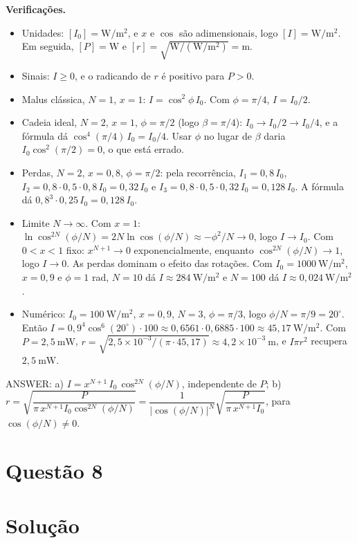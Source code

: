 \documentclass{article}%
\begin{document}
\textbf{Verificações.}
\begin{itemize}
\item Unidades: $[I_0]=\mathrm{W/m^2}$, e $x$ e $\cos$ são adimensionais, logo $[I]=\mathrm{W/m^2}$. Em seguida, $[P]=\mathrm{W}$ e $[r]=\sqrt{\mathrm{W}/(\mathrm{W/m^2})}=\mathrm{m}$.
\item Sinais: $I\ge 0$, e o radicando de $r$ é positivo para $P>0$.
\item Malus clássica, $N=1$, $x=1$: $I=\cos^2\phi\,I_0$. Com $\phi=\pi/4$, $I=I_0/2$.
\item Cadeia ideal, $N=2$, $x=1$, $\phi=\pi/2$ (logo $\beta=\pi/4$): $I_0\to I_0/2\to I_0/4$, e a fórmula dá $\cos^4(\pi/4)\,I_0=I_0/4$. Usar $\phi$ no lugar de $\beta$ daria $I_0\cos^2(\pi/2)=0$, o que está errado.
\item Perdas, $N=2$, $x=0{,}8$, $\phi=\pi/2$: pela recorrência, $I_1=0{,}8\,I_0$, $I_2=0{,}8\cdot 0{,}5\cdot 0{,}8\,I_0=0{,}32\,I_0$ e $I_3=0{,}8\cdot 0{,}5\cdot 0{,}32\,I_0=0{,}128\,I_0$. A fórmula dá $0{,}8^3\cdot 0{,}25\,I_0=0{,}128\,I_0$.
\item Limite $N\to\infty$. Com $x=1$: $\ln\cos^{2N}(\phi/N)=2N\ln\cos(\phi/N)\approx -\phi^2/N\to 0$, logo $I\to I_0$. Com $0<x<1$ fixo: $x^{N+1}\to 0$ exponencialmente, enquanto $\cos^{2N}(\phi/N)\to 1$, logo $I\to 0$. As perdas dominam o efeito das rotações. Com $I_0=1000\ \mathrm{W/m^2}$, $x=0{,}9$ e $\phi=1$ rad, $N=10$ dá $I\approx 284\ \mathrm{W/m^2}$ e $N=100$ dá $I\approx 0{,}024\ \mathrm{W/m^2}$.
\item Numérico: $I_0=100\ \mathrm{W/m^2}$, $x=0{,}9$, $N=3$, $\phi=\pi/3$, logo $\phi/N=\pi/9=20^\circ$. Então $I=0{,}9^4\cos^6(20^\circ)\cdot 100\approx 0{,}6561\cdot 0{,}6885\cdot 100\approx 45{,}17\ \mathrm{W/m^2}$. Com $P=2{,}5\ \mathrm{mW}$, $r=\sqrt{2{,}5\times 10^{-3}/(\pi\cdot 45{,}17)}\approx 4{,}2\times 10^{-3}\ \mathrm{m}$, e $I\pi r^2$ recupera $2{,}5\ \mathrm{mW}$.
\end{itemize}

ANSWER: a) $I = x^{N+1}\, I_0\, \cos^{2N}(\phi/N)$, independente de $P$; b) $r = \sqrt{\dfrac{P}{\pi\, x^{N+1} I_0 \cos^{2N}(\phi/N)}} = \dfrac{1}{|\cos(\phi/N)|^{N}}\sqrt{\dfrac{P}{\pi\, x^{N+1} I_0}}$, para $\cos(\phi/N)\neq 0$.%
\newpage%
\section*{Questão 8}

\section*{Solução}
\end{document}
